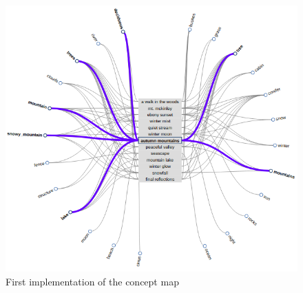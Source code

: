 \documentclass[a4paper]{tufte-book}
\begin{document}
\begin{figure}
	\includegraphics{Images/firstImplementation.png}
	\caption{First implementation of the concept map}
	\label{fig:concept2}
\end{figure}


\backmatter





\printindex
\end{document}
